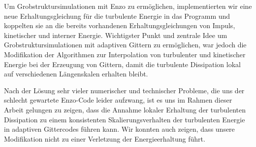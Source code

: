 Um Grobstruktursimulationen mit Enzo zu ermöglichen, implementierten wir eine
neue Erhaltungsgleichung für die turbulente Energie in das Programm und
koppelten sie an die bereits vorhandenen Erhaltungsgleichungen von Impuls,
kinetischer und interner Energie. Wichtigster Punkt und zentrale Idee um
Grobstruktursimulationen mit adaptiven Gittern zu ermöglichen, war jedoch   
die Modifikation der Algorithmen zur Interpolation von turbulenter und
kinetischer Energie bei der Erzeugung von Gittern, damit die turbulente
Dissipation lokal auf verschiedenen Längenskalen erhalten bleibt. 
 
Nach der Lösung sehr vieler numerischer und technischer Probleme, die uns der
schlecht gewartete Enzo-Code leider aufzwang, ist es uns im Rahmen dieser
Arbeit gelungen zu zeigen, dass die Annahme lokaler Erhaltung der turbulenten 
Dissipation zu einem konsistenten Skalierungsverhalten der turbulenten Energie
in adaptiven Gittercodes führen kann. Wir konnten auch zeigen, dass unsere
Modifikation nicht zu einer Verletzung der Energieerhaltung führt.

